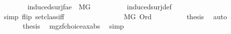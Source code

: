 \begin{isabellebody}
\ \ \ \ \ \ \isamarkupfalse%
\ {\isachardoublequoteopen}induced{\isacharunderscore}{\kern0pt}surj{\isacharparenleft}{\kern0pt}f{\isacharcomma}{\kern0pt}a{\isacharcomma}{\kern0pt}e{\isacharparenright}{\kern0pt}\ {\isasymin}\ M{\isacharbrackleft}{\kern0pt}G{\isacharbrackright}{\kern0pt}{\isachardoublequoteclose}\isanewline
\ \ \ \ \ \ \ \ \isamarkupfalse%
\ induced{\isacharunderscore}{\kern0pt}surj{\isacharunderscore}{\kern0pt}def\ \isanewline
\ \ \ \ \ \ \ \ \isamarkupfalse%
\ {\isacharparenleft}{\kern0pt}simp\ flip{\isacharcolon}{\kern0pt}\ setclass{\isacharunderscore}{\kern0pt}iff{\isacharparenright}{\kern0pt}\isanewline
\ \ \ \ \ \ \isamarkupfalse%
\ \isamarkupfalse%
\isanewline
\ \ \ \ \ \ \ \ {\isacartoucheopen}{\isasymalpha}{\isasymin}M{\isacharbrackleft}{\kern0pt}G{\isacharbrackright}{\kern0pt}{\isacartoucheclose}\ {\isacartoucheopen}Ord{\isacharparenleft}{\kern0pt}{\isasymalpha}{\isacharparenright}{\kern0pt}{\isacartoucheclose}\isanewline
\ \ \ \ \ \ \isamarkupfalse%
\ \isamarkupfalse%
\ {\isacharquery}{\kern0pt}thesis\ \isamarkupfalse%
\ auto\isanewline
\ \ \ \ \isamarkupfalse%
\isanewline
\ \ \isacommand{{\isacharbraceright}{\kern0pt}}\isamarkupfalse%
\isanewline
\ \ \isamarkupfalse%
\isanewline
\ \ \isamarkupfalse%
\ {\isacharquery}{\kern0pt}thesis\ \isamarkupfalse%
\ mgzf{\isachardot}{\kern0pt}choice{\isacharunderscore}{\kern0pt}ax{\isacharunderscore}{\kern0pt}abs\ \isamarkupfalse%
\ simp\isanewline
{}\isamarkupfalse%
%
\endisatagproof
{\isafoldproof}%
%
\isadelimproof
\isanewline
%
\endisadelimproof
\ \ \isanewline
{}\isamarkupfalse%
\ \isanewline
%
\isadelimtheory
\ \ \isanewline
%
\endisadelimtheory
%
\isatagtheory
{}\isamarkupfalse%
%
\endisatagtheory
{\isafoldtheory}%
%
\isadelimtheory
%
\endisadelimtheory
%
\end{isabellebody}%
\endinput
